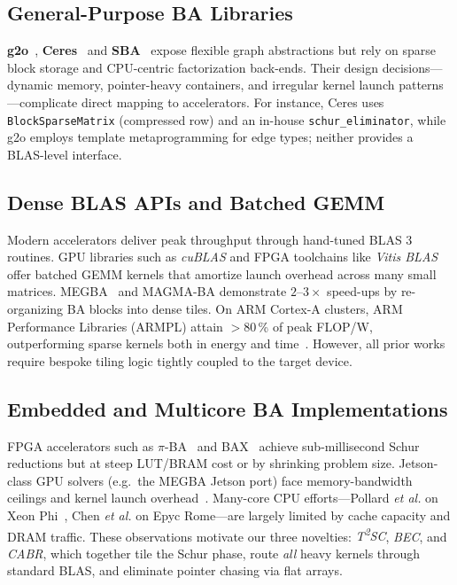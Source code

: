 \subsection{General-Purpose BA Libraries}
\label{sec:ba_libs}

\textbf{g2o}~\cite{Kuemmerle2011}, \textbf{Ceres}~\cite{Agarwal2012} and
\textbf{SBA}~\cite{Ni2007} expose flexible graph abstractions but rely on
sparse block storage and CPU-centric factorization back-ends.  Their design
decisions—dynamic memory, pointer-heavy containers, and irregular
kernel launch patterns—complicate direct mapping to accelerators.  For
instance, Ceres uses
\texttt{BlockSparseMatrix} (compressed row) and an in-house
\texttt{schur\_eliminator}, while g2o employs template metaprogramming for
edge types; neither provides a BLAS-level interface.

\subsection{Dense BLAS APIs and Batched GEMM}
\label{sec:blas}

Modern accelerators deliver peak throughput through hand-tuned BLAS 3
routines.  GPU libraries such as \emph{cuBLAS} and FPGA toolchains like
\emph{Vitis BLAS} offer batched GEMM kernels that amortize launch overhead
across many small matrices.  MEGBA~\cite{Harhash2017} and MAGMA-BA
demonstrate $2$–$3\times$ speed-ups by re-organizing BA blocks into dense
tiles.  On ARM Cortex-A clusters, ARM Performance Libraries (ARMPL) attain
$>$80\,\% of peak FLOP/W, outperforming sparse kernels both in energy and
time~\cite{Zhang2024}.  However, all prior works require bespoke tiling
logic tightly coupled to the target device.

\subsection{Embedded and Multicore BA Implementations}
\label{sec:embedded}

FPGA accelerators such as $\pi$-BA~\cite{Liu2020} and BAX~\cite{Sun2020} achieve
sub-millisecond Schur reductions but at steep LUT/BRAM cost or by shrinking
problem size.  Jetson-class GPU solvers (e.g.\ the MEGBA Jetson port) face
memory-bandwidth ceilings and kernel launch overhead~\cite{Harhash2017}.
Many-core CPU efforts—Pollard \emph{et al.} on Xeon Phi~\cite{Pollard2015},
Chen \emph{et al.} on Epyc Rome—are largely limited by cache capacity and DRAM
traffic.  These observations motivate our three novelties:
\emph{T\textsuperscript{2}SC}, \emph{BEC}, and \emph{CABR}, which together
tile the Schur phase, route \emph{all} heavy kernels through standard BLAS,
and eliminate pointer chasing via flat arrays.

